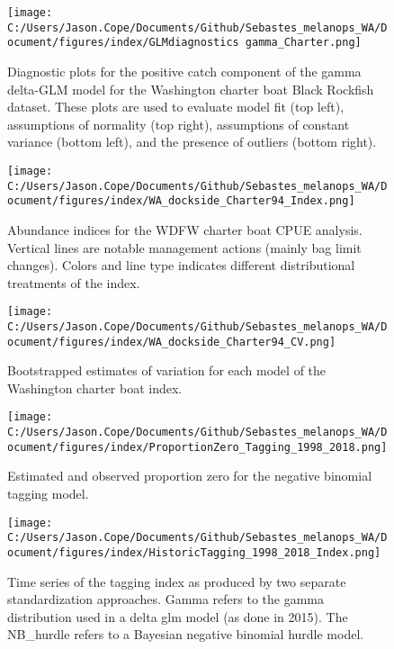 \documentclass[11pt,
  english,
  letterpaper,
]{article}
\begin{document}
\begin{figure}
\centering
\texttt{[image: C:/Users/Jason.Cope/Documents/Github/Sebastes\_melanops\_WA/Document/figures/index/GLMdiagnostics gamma\_Charter.png]}
\caption{Diagnostic plots for the positive catch component of the gamma delta-GLM model for the Washington charter boat Black Rockfish dataset. These plots are used to evaluate model fit (top left), assumptions of normality (top right), assumptions of constant variance (bottom left), and the presence of outliers (bottom right).\label{fig:charter-gam-diags}}
\end{figure}

\begin{figure}
\centering
\texttt{[image: C:/Users/Jason.Cope/Documents/Github/Sebastes\_melanops\_WA/Document/figures/index/WA\_dockside\_Charter94\_Index.png]}
\caption{Abundance indices for the WDFW charter boat CPUE analysis. Vertical lines are notable management actions (mainly bag limit changes). Colors and line type indicates different distributional treatments of the index.\label{fig:charter-index}}
\end{figure}

\begin{figure}
\centering
\texttt{[image: C:/Users/Jason.Cope/Documents/Github/Sebastes\_melanops\_WA/Document/figures/index/WA\_dockside\_Charter94\_CV.png]}
\caption{Bootstrapped estimates of variation for each model of the Washington charter boat index.\label{fig:charter-CVs}}
\end{figure}

\begin{figure}
\centering
\texttt{[image: C:/Users/Jason.Cope/Documents/Github/Sebastes\_melanops\_WA/Document/figures/index/ProportionZero\_Tagging\_1998\_2018.png]}
\caption{Estimated and observed proportion zero for the negative binomial tagging model.\label{fig:prop-zero-tag}}
\end{figure}

\begin{figure}
\centering
\texttt{[image: C:/Users/Jason.Cope/Documents/Github/Sebastes\_melanops\_WA/Document/figures/index/HistoricTagging\_1998\_2018\_Index.png]}
\caption{Time series of the tagging index as produced by two separate standardization approaches. Gamma refers to the gamma distribution used in a delta glm model (as done in 2015). The NB\_hurdle refers to a Bayesian negative binomial hurdle model.\label{fig:tag-index}}
\end{figure}
\end{document}
